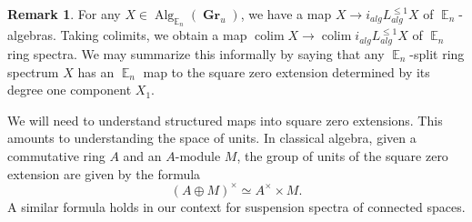 \documentclass[reqno, oneside]{amsart}
\theoremstyle{definition}
\newtheorem{rmk}[nul]{Remark}
\theoremstyle{plain}
\DeclareMathOperator*{\colim}{\text{colim}}
\DeclareMathOperator{\E}{\mathbb{E}}
\DeclareMathOperator{\Gr}{\textbf{Gr}}
\DeclareMathOperator{\Alg}{\text{Alg}}
\begin{document}
\begin{rmk} \label{rmk:maptosq0}
For any $X\in \Alg_{\E_n}(\Gr_u)$, we have a map $X\to i_{alg}L^{\leq 1}_{alg}X$ of $\E_n$-algebras.  Taking colimits, we obtain a map $\colim X \to \colim i_{alg}L^{\leq 1}_{alg}X$ of $\E_n$ ring spectra.
 We may summarize this informally by saying that any $\E_n$-split ring spectrum $X$ has an $\E_n$ map to the square zero extension determined by its degree one component $X_1$.  
 \end{rmk}

We will need to understand structured maps into square zero extensions.  This amounts to understanding the space of units.  In classical algebra, given a commutative ring $A$ and an $A$-module $M$, the group of units of the square zero extension are given by the formula $$(A\oplus M)^{\times} \simeq A^{\times} \times M.$$ A similar formula holds in our context for suspension spectra of connected spaces.  
\end{document}

